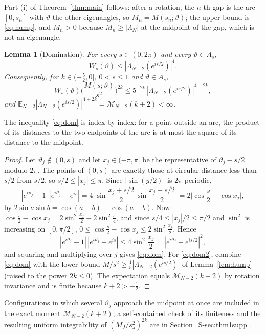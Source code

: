 \documentclass[12pt]{amsart}
\newtheorem{lemma}{Lemma}
\theoremstyle{remark}
\newcommand{\E}{\mathbb{E}}
\newcommand{\1}{\mathbf{1}}
\begin{document}
Part (i) of Theorem~\ref{thm:main} follows: after a rotation, the $n$-th
gap is the arc $[0,s_n]$ with $\vartheta$ the other eigenangles, so
$M_n=M(s_n;\vartheta)$; the upper bound is \eqref{eq:hump}, and $M_n>0$
because $M_n\ge|\Lambda_N|$ at the midpoint of the gap, which is not an
eigenangle.

\begin{lemma}[Domination]\label{lem:dom}
For every $s\in(0,2\pi)$ and every $\vartheta\in A_s$,
\begin{equation}\label{eq:dom}
W_s(\vartheta)\le|\Lambda_{N-2}(e^{is/2})|^4 .
\end{equation}
Consequently, for $k\in(-\frac52,0]$, $0<s\le1$ and $\vartheta\in A_s$,
\begin{equation}\label{eq:dom2}
W_s(\vartheta)\Big(\frac{M(s;\vartheta)}{s^2}\Big)^{2k}\le
5^{-2k}\,|\Lambda_{N-2}(e^{is/2})|^{4+2k},
\end{equation}
and $\E_{N-2}|\Lambda_{N-2}(e^{is/2})|^{4+2k}=\mathcal M_{N-2}(k+2)<\infty$.
\end{lemma}

The inequality \eqref{eq:dom} is index by index: for a point outside an
arc, the product of its distances to the two endpoints of the arc is at
most the square of its distance to the midpoint.

\begin{proof}
Let $\vartheta_j\notin(0,s)$ and let $x_j\in(-\pi,\pi]$ be the
representative of $\vartheta_j-s/2$ modulo $2\pi$. The points of $(0,s)$
are exactly those at circular distance less than $s/2$ from $s/2$, so
$s/2\le|x_j|\le\pi$. Since $|\sin(y/2)|$ is $2\pi$-periodic,
\[
|e^{i\vartheta_j}-1|\,|e^{i\vartheta_j}-e^{is}|
=4\Big|\sin\frac{x_j+s/2}{2}\,\sin\frac{x_j-s/2}{2}\Big|
=2\Big|\cos\frac s2-\cos x_j\Big| ,
\]
by $2\sin a\sin b=\cos(a-b)-\cos(a+b)$. Now
$\cos\frac s2-\cos x_j=2\sin^2\frac{x_j}2-2\sin^2\frac s4$, and since
$s/4\le|x_j|/2\le\pi/2$ and $\sin^2$ is increasing on $[0,\pi/2]$,
$0\le\cos\frac s2-\cos x_j\le2\sin^2\frac{x_j}2$. Hence
\[
|e^{i\vartheta_j}-1|\,|e^{i\vartheta_j}-e^{is}|\le4\sin^2\frac{x_j}2
=|e^{i\vartheta_j}-e^{is/2}|^2 ,
\]
and squaring and multiplying over $j$ gives \eqref{eq:dom}. For
\eqref{eq:dom2}, combine \eqref{eq:dom} with the lower bound
$M/s^2\ge\frac15|\Lambda_{N-2}(e^{is/2})|$ of Lemma~\ref{lem:hump} (raised
to the power $2k\le0$). The expectation equals
$\mathcal M_{N-2}(k+2)$ by rotation invariance and is finite because
$k+2>-\frac12$.
\end{proof}

Configurations in which several $\vartheta_j$ approach the midpoint at once
are included in the exact moment $\mathcal M_{N-2}(k+2)$; a
self-contained check of its finiteness and the resulting uniform
integrability of $(M_J/s_J^2)^{2k}$ are in Section~\ref{S-sec:thm1supp}.
\end{document}
